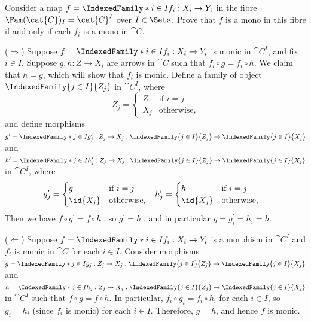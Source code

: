 \begin{exercise}
Consider a map \(f = \IndexedFamily*{i \in I}{f_i : X_i \to Y_i}\) in the fibre \(\Fam(\cat{C})_I = \cat{C}^I\) over \(I \in \Sets\).
Prove that \(f\) is a mono in this fibre if and only if each \(f_i\) is a mono in \(\cat{C}\).
\end{exercise}

\begin{solution}
(\(\Longrightarrow\))
Suppose \(f = \IndexedFamily*{i \in I}{f_i : X_i \to Y_i}\) is monic in \(\cat{C}^I\), and fix \(i \in I\).
Suppose \(g, h : Z \to X_i\) are arrows in \(\cat{C}\) such that \(f_i \circ g = f_i \circ h\).
We claim that \(h = g\), which will show that \(f_i\) is monic.
Define a family of object \(\IndexedFamily{j \in I}{Z_j}\) in \(\cat{C}^I\), where
\begin{equation*}
Z_j = \begin{cases}
Z & \text{if \(i = j\)} \\
X_j & \text{otherwise,}
\end{cases}
\end{equation*}
and define morphisms \(g^\prime = \IndexedFamily*{j \in I}{g_j^\prime : Z_j \to X_j} : \IndexedFamily{j \in I}{Z_j} \to \IndexedFamily{j \in I}{X_j}\) and \(h^\prime = \IndexedFamily*{j \in I}{h_j^\prime : Z_j \to X_j} : \IndexedFamily{j \in I}{Z_j} \to \IndexedFamily{j \in I}{X_j}\) in \(\cat{C}^I\), where
\begin{align*}
g_j^\prime &= \begin{cases}
g & \text{if \(i = j\)} \\
\id{X_j} & \text{otherwise,}
\end{cases} &
h_j^\prime &= \begin{cases}
h & \text{if \(i = j\)} \\
\id{X_j} & \text{otherwise,}
\end{cases}
\end{align*}
Then we have \(f \circ g^\prime = f \circ h^\prime\), so \(g^\prime = h^\prime\), and in particular \(g = g^\prime_i = h^\prime_i = h\).

(\(\Longleftarrow\))
Suppose \(f = \IndexedFamily*{i \in I}{f_i : X_i \to Y_i}\) is a morphism in \(\cat{C}^I\) and \(f_i\) is monic in \(\cat{C}\) for each \(i \in I\).
Consider morphisms \(g = \IndexedFamily*{j \in I}{g_j : Z_j \to X_j} : \IndexedFamily{j \in I}{Z_j} \to \IndexedFamily{j \in I}{X_j}\) and \(h = \IndexedFamily*{j \in I}{h_j : Z_j \to X_j} : \IndexedFamily{j \in I}{Z_j} \to \IndexedFamily{j \in I}{X_j}\) in \(\cat{C}^I\) such that \(f \circ g = f \circ h\).
In particular, \(f_i \circ g_i = f_i \circ h_i\) for each \(i \in I\), so \(g_i = h_i\) (since \(f_i\) is monic) for each \(i \in I\).
Therefore, \(g = h\), and hence \(f\) is monic.
\end{solution}